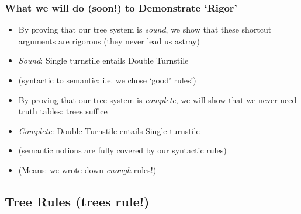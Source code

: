 \begin{frame}
\frametitle{What we will do (soon!) to Demonstrate `Rigor'}



\begin{itemize}[<+->]

\item By proving that our tree system is \textit{sound}, we show that these shortcut arguments are rigorous (they never lead us astray)

\medskip 

\bi

\item \emph{Sound}: Single turnstile entails Double Turnstile 

\item (syntactic to semantic: i.e. we chose `good' rules!)

\ei

\bigskip 

\item By proving that our tree system is \textit{complete}, we will show that we never need truth tables: trees suffice

\medskip 

\bi

\item \emph{Complete}: Double Turnstile entails  Single turnstile  

\item (semantic notions are fully covered by our syntactic rules)

\item (Means: we wrote down \textit{enough} rules!)

\ei

\end{itemize}
\end{frame}


\subsection{Tree Rules (trees rule!)}

